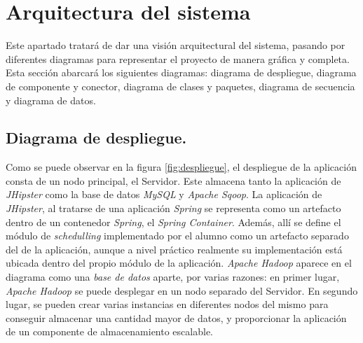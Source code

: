 \section{Arquitectura del sistema} \label{disenyo.arquitectura}
\par Este apartado tratará de dar una visión arquitectural del sistema, pasando por diferentes diagramas para representar el proyecto de manera gráfica y completa. Esta sección abarcará los siguientes diagramas: diagrama de despliegue, diagrama de componente y conector, diagrama de clases y paquetes, diagrama de secuencia y diagrama de datos. 

\subsection{Diagrama de despliegue.} \label{disenyo.arquitectura.despliegue}
\par Como se puede observar en la figura \ref{fig:despliegue}, el despliegue de la aplicación consta de un nodo principal, el Servidor. Este almacena tanto la aplicación de \textit{JHipster} como la base de datos \textit{MySQL} y \textit{Apache Sqoop}. La aplicación de \textit{JHipster}, al tratarse de una aplicación \textit{Spring} se representa como un artefacto dentro de un contenedor \textit{Spring}, el \textit{Spring Container}. Además, allí se define el módulo de \textit{schedulling} implementado por el alumno como un artefacto separado del de la aplicación, aunque a nivel práctico realmente su implementación está ubicada dentro del propio módulo de la aplicación. \textit{Apache Hadoop} aparece en el diagrama como una \textit{base de datos} aparte, por varias razones: en primer lugar, \textit{Apache Hadoop} se puede desplegar en un nodo separado del Servidor. En segundo lugar, se pueden crear varias instancias en diferentes nodos del mismo para conseguir almacenar una cantidad mayor de datos, y proporcionar la aplicación de un componente de almacenamiento escalable.
